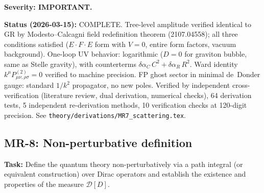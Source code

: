 \documentclass[12pt,a4paper]{article}
\newcommand{\task}[1]{\noindent\textbf{Task:} #1\par}
\begin{document}
\textbf{Severity: IMPORTANT.}

\textbf{Status (2026-03-15):} \textcolor{proven}{COMPLETE.}
Tree-level amplitude verified identical to GR by Modesto--Calcagni field
redefinition theorem (2107.04558); all three conditions satisfied ($E \cdot F \cdot E$
form with $V=0$, entire form factors, vacuum background). One-loop UV behavior:
logarithmic ($D=0$ for graviton bubble, same as Stelle gravity), with counterterms
$\delta\alpha_C\, C^2 + \delta\alpha_R\, R^2$. Ward identity $k^\mu P^{(2)}_{\mu\nu,\rho\sigma}=0$
verified to machine precision. FP ghost sector in minimal de~Donder gauge: standard
$1/k^2$ propagator, no new poles.
Verified by independent cross-verification (literature review, dual derivation, numerical checks),
64 derivation tests, 5 independent re-derivation methods, 10 verification checks at 120-digit precision.
See \texttt{theory/derivations/MR7\_scattering.tex}.

\subsection{MR-8: Non-perturbative definition}
\label{task:MR8}

\task{Define the quantum theory non-perturbatively via a path integral
(or equivalent construction) over Dirac operators and establish the
existence and properties of the measure $\mathcal{D}[D]$.}
\end{document}
